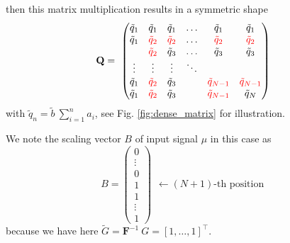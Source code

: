 then this matrix multiplication results in a symmetric shape
\begin{equation*}
	\mathbf{Q} =~ 
	\def\aa{\color{red}\tilde{q}_{2}}
	\def\ab{\color{red}\tilde{q}_{N-1}}
	\begin{pmatrix}
		\tilde{q}_{1} & \tilde{q}_{1} & \tilde{q}_{1} & \ldots & \tilde{q}_{1} & \tilde{q}_{1} \\
		\tilde{q}_{1} & \aa & \aa & \ldots & \aa & \aa \\
		& \aa & \tilde{q}_{3} & \ldots & \tilde{q}_{3} & \tilde{q}_{3} \\
		\vdots     & \vdots & \vdots & \ddots \\
		\tilde{q}_{1}& \aa & \tilde{q}_{3} & & \ab & \ab \\
		\tilde{q}_{1} & \aa & \tilde{q}_{3} & & \ab & \tilde{q}_{N}
	\end{pmatrix} \\
\end{equation*}
with $\tilde{q}_{n} = \tilde{b} ~ \sum\limits_{i=1}^{n} a_{i}$, see Fig. \ref{fig:dense_matrix} for illustration.

We note the scaling vector $B$ of input signal $\mu$ in this case as
\begin{equation*}
	B = 
	\begin{pmatrix}
		0 \\
		\vdots \\
		0 \\
		1 \\
		1 \\
		\vdots \\
		1
	\end{pmatrix}
	\begin{matrix}
		\\
		\\
		\\
		\leftarrow (N+1)\text{-th position}\\
		\\
		\\
		~
	\end{matrix}
\end{equation*}
because we have here $\tilde{G} = \mathbf{F}^{-1}~G = \left[1,\ldots,1\right]^\top$.